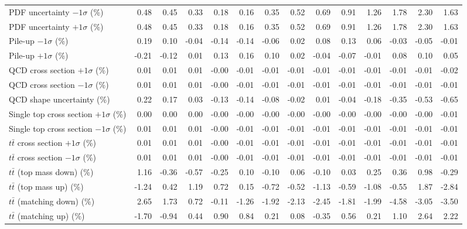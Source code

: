 \begin{table}[htbp]
{\begin{tabular}{lrrrrrrrrrrrrr}
PDF uncertainty $-1\sigma$ (\%) & 0.48 & 0.45 & 0.33 & 0.18 & 0.16 & 0.35 & 0.52 & 0.69 & 0.91 & 1.26 & 1.78 & 2.30 & 1.63 \\ 
PDF uncertainty $+1\sigma$ (\%) & 0.48 & 0.45 & 0.33 & 0.18 & 0.16 & 0.35 & 0.52 & 0.69 & 0.91 & 1.26 & 1.78 & 2.30 & 1.63 \\ 
Pile-up $-1\sigma$ (\%) & 0.19 & 0.10 & -0.04 & -0.14 & -0.14 & -0.06 & 0.02 & 0.08 & 0.13 & 0.06 & -0.03 & -0.05 & -0.01 \\ 
Pile-up $+1\sigma$ (\%) & -0.21 & -0.12 & 0.01 & 0.13 & 0.16 & 0.10 & 0.02 & -0.04 & -0.07 & -0.01 & 0.08 & 0.10 & 0.05 \\ 
QCD cross section \ensuremath{+1\sigma} (\%) & 0.01 & 0.01 & 0.01 & -0.00 & -0.01 & -0.01 & -0.01 & -0.01 & -0.01 & -0.01 & -0.01 & -0.01 & -0.02 \\ 
QCD cross section \ensuremath{-1\sigma} (\%) & 0.01 & 0.01 & 0.01 & -0.00 & -0.01 & -0.01 & -0.01 & -0.01 & -0.01 & -0.01 & -0.01 & -0.01 & -0.01 \\ 
QCD shape uncertainty (\%) & 0.22 & 0.17 & 0.03 & -0.13 & -0.14 & -0.08 & -0.02 & 0.01 & -0.04 & -0.18 & -0.35 & -0.53 & -0.65 \\ 
Single top cross section $+1\sigma$ (\%) & 0.00 & 0.00 & 0.00 & -0.00 & -0.00 & -0.00 & -0.00 & -0.00 & -0.00 & -0.00 & -0.00 & -0.00 & -0.01 \\ 
Single top cross section $-1\sigma$ (\%) & 0.01 & 0.01 & 0.01 & -0.00 & -0.01 & -0.01 & -0.01 & -0.01 & -0.01 & -0.01 & -0.01 & -0.01 & -0.01 \\ 
$t\bar{t}$ cross section $+1\sigma$ (\%) & 0.01 & 0.01 & 0.01 & -0.00 & -0.01 & -0.01 & -0.01 & -0.01 & -0.01 & -0.01 & -0.01 & -0.01 & -0.01 \\ 
$t\bar{t}$ cross section $-1\sigma$ (\%) & 0.01 & 0.01 & 0.01 & -0.00 & -0.01 & -0.01 & -0.01 & -0.01 & -0.01 & -0.01 & -0.01 & -0.01 & -0.01 \\ 
$t\bar{t}$ (top mass down) (\%) & 1.16 & -0.36 & -0.57 & -0.25 & 0.10 & -0.10 & 0.06 & -0.10 & 0.03 & 0.25 & 0.36 & 0.98 & -0.29 \\ 
$t\bar{t}$ (top mass up) (\%) & -1.24 & 0.42 & 1.19 & 0.72 & 0.15 & -0.72 & -0.52 & -1.13 & -0.59 & -1.08 & -0.55 & 1.87 & -2.84 \\ 
$t\bar{t}$ (matching down) (\%) & 2.65 & 1.73 & 0.72 & -0.11 & -1.26 & -1.92 & -2.13 & -2.45 & -1.81 & -1.99 & -4.58 & -3.05 & -3.50 \\ 
$t\bar{t}$ (matching up) (\%) & -1.70 & -0.94 & 0.44 & 0.90 & 0.84 & 0.21 & 0.08 & -0.35 & 0.56 & 0.21 & 1.10 & 2.64 & 2.22 \\ 

\end{tabular}}
\end{table}
